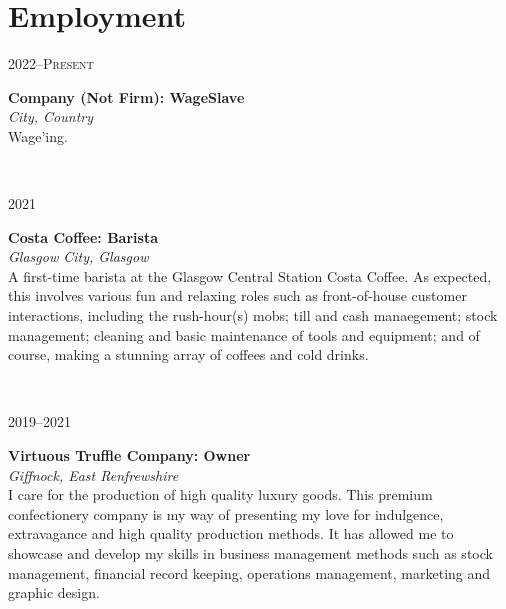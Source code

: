 \documentclass[11pt, english]{article}
\begin{document}
{\section{Employment}

\begin{minipage}[t]{.15\linewidth}
	\hfill
	\textsc{2022--Present}
\end{minipage}
\hfill\vline\hfill
\begin{minipage}[t]{.80\linewidth}
	\textbf{Company (Not Firm): WageSlave}\\
	\textit{City, Country}\\
	Wage'ing.
\end{minipage}\\
\vspace{0.25cm}

\begin{minipage}[t]{.15\linewidth}
	\hfill
	\textsc{2021}
\end{minipage}
\hfill\vline\hfill
\begin{minipage}[t]{.80\linewidth}
	\textbf{Costa Coffee: Barista}\\
	\textit{Glasgow City, Glasgow}\\
	A first-time barista at the Glasgow Central Station Costa Coffee. As expected, this involves various fun and relaxing roles such as front-of-house customer interactions, including the rush-hour(s) mobs; till and cash manaegement; stock management; cleaning and basic maintenance of tools and equipment; and of course, making a stunning array of coffees and cold drinks.
\end{minipage}\\
\vspace{0.25cm}

\begin{minipage}[t]{.15\linewidth}
        \hfill 
        \textsc{2019--2021}
\end{minipage}
\hfill\vline\hfill
\begin{minipage}[t]{.80\linewidth}
        \textbf{Virtuous Truffle Company: Owner}\\
	\textit{Giffnock, East Renfrewshire}\\ 
	I care for the production of high quality luxury goods. This premium confectionery company is my way of presenting my love for indulgence, extravagance and high quality production methods. It has allowed me to showcase and develop my skills in business management methods such as stock management, financial record keeping, operations management, marketing and graphic design.
\end{minipage}\\
\vspace{0.25cm}

}
\end{document}
